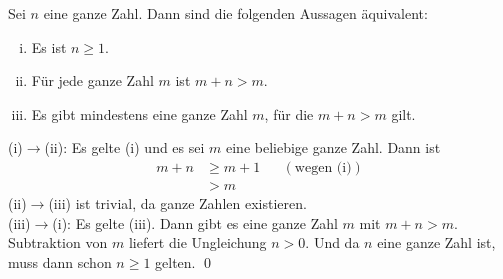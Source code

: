 \begin{bsp} \label{bsp:ringschluss}
    Sei $n$ eine ganze Zahl. Dann sind die folgenden Aussagen äquivalent:
    \begin{enumerate}[(i)]
        \item Es ist $n\ge 1$.
        \item Für jede ganze Zahl $m$ ist $m+n>m$.
        \item Es gibt mindestens eine ganze Zahl $m$, für die $m+n>m$ gilt.
    \end{enumerate}
\end{bsp}


\begin{bew}
    (i)$\to$(ii): Es gelte (i) und es sei $m$ eine beliebige ganze Zahl. Dann ist
    \begin{align*}
        m+n & \ge m+1 && (\text{wegen (i)}) \\
        & > m
    \end{align*}
    (ii)$\to$(iii) ist trivial, da ganze Zahlen existieren. \\[0.5em]
    (iii)$\to$(i): Es gelte (iii). Dann gibt es eine ganze Zahl $m$ mit $m+n>m$. Subtraktion von $m$ liefert die Ungleichung $n>0$. Und da $n$ eine ganze Zahl ist, muss dann schon $n\ge 1$ gelten. \qed
\end{bew}


